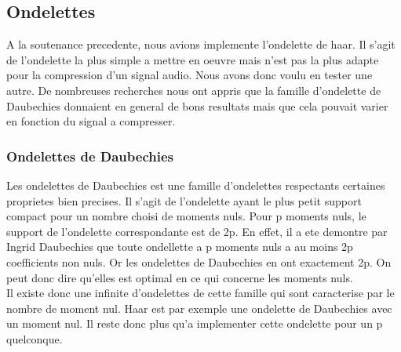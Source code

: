 \documentclass[a4paper,12pt]{article}
\begin{document}
	\subsection{Ondelettes}
A la soutenance precedente, nous avions implemente l'ondelette de
haar. Il s'agit de l'ondelette la plus simple a mettre en oeuvre mais
n'est pas la plus adapte pour la compression d'un signal audio.
Nous avons donc voulu en tester une autre. De nombreuses recherches
nous ont appris que la famille d'ondelette de Daubechies donnaient en
general de bons resultats mais que cela pouvait varier en fonction du
signal a compresser.\\
\subsubsection{Ondelettes de Daubechies}
Les ondelettes de Daubechies est une famille d'ondelettes respectants
certaines proprietes bien precises. Il s'agit de l'ondelette ayant le
plus petit support compact pour un nombre choisi de moments nuls. Pour
p moments nuls, le support de l'ondelette correspondante est de 2p. En
effet, il a ete demontre par Ingrid Daubechies que toute ondellette a
p moments nuls a au moins 2p coefficients non nuls. Or les ondelettes
de Daubechies en ont exactement 2p. On peut donc dire qu'elles est
optimal en ce qui concerne les moments nuls.\\
Il existe donc une infinite d'ondelettes de cette famille qui sont
caracterise par le nombre de moment nul. Haar est par exemple une
ondelette de Daubechies avec un moment nul. Il reste donc plus qu'a
implementer cette ondelette pour un p quelconque.
\end{document}

